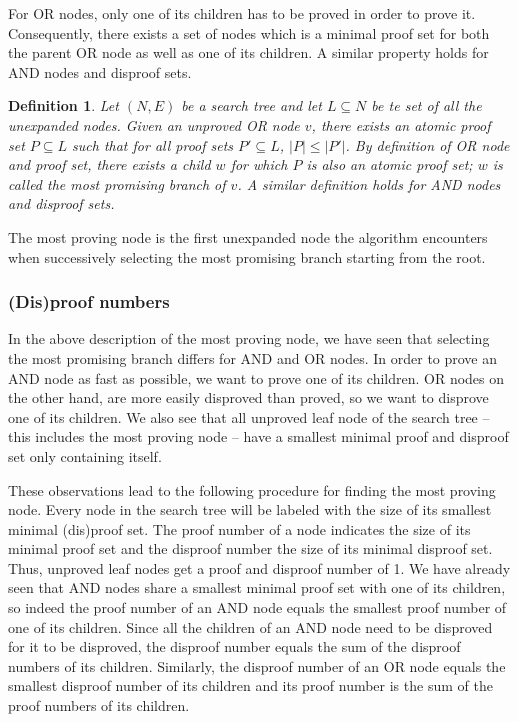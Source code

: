 \documentclass{article}
\newtheorem{mydef}{Definition}
\begin{document}
For OR nodes, only one of its children has to be proved in order to prove it. Consequently, there exists a set of nodes which is a minimal
proof set for both the parent OR node as well as one of its children. A similar property holds for AND nodes and disproof sets.
\begin{mydef}
Let $(N, E)$ be a search tree and let $L \subseteq N$ be te set of all the unexpanded nodes.
Given an unproved OR node $v$, there exists an atomic proof set $P \subseteq L$ such that for all proof sets $P' \subseteq L$, $|P| \leq |P'|$.
By definition of OR node and proof set, there exists a child $w$ for which $P$ is also an atomic proof set; $w$ is called the most promising branch
of $v$. A similar definition holds for AND nodes and disproof sets.
\end{mydef}
The most proving node is the first unexpanded node the algorithm encounters when successively selecting the most promising branch starting from
the root.

\subsubsection*{(Dis)proof numbers}
In the above description of the most proving node, we have seen that selecting the most promising branch differs for AND and OR nodes.
In order to prove an AND node as fast as possible, we want to prove one of its children. OR nodes on the other hand, are more easily disproved than
proved, so we want to disprove one of its children. We also see that all unproved leaf node of the search tree -- this includes the most proving
node -- have a smallest minimal proof and disproof set only containing itself.

These observations lead to the following procedure for finding the most proving node. Every node in the search tree will be labeled with the
size of its smallest minimal (dis)proof set. The proof number of a node indicates the size of its minimal proof set and the disproof number
the size of its minimal disproof set. Thus, unproved leaf nodes get a proof and disproof number of 1. We have already seen that AND nodes share
a smallest minimal proof set with one of its children, so indeed the proof number of an AND node equals the smallest proof number of one of
its children. Since all the children of an AND node need to be disproved for it to be disproved, the disproof number equals the sum of the disproof
numbers of its children. Similarly, the disproof number of an OR node equals the smallest disproof number of its children and its proof number
is the sum of the proof numbers of its children.
\end{document}
